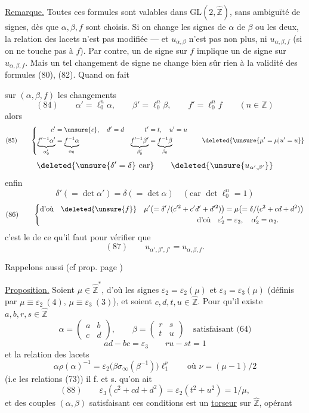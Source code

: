 \uline{Remarque.} Toutes ces formules sont valables dans $\mathrm{GL}(2,\widehat{\mathbb Z})$, sans ambiguïté de signes, dès que $\alpha,\beta,f$ sont choisis. Si on change les signes de $\alpha$  de $\beta$ ou les deux, la relation des lacets n'est pas modifiée --- et $u_{\alpha,\beta}$ n'est pas  non plus,  ni $u_{\alpha,\beta,f}$ (si on ne touche pas à $f$). Par contre, un  de signe sur $f$ implique un  de signe sur $u_{\alpha,\beta,f}$. Mais un tel changement de signe ne change bien sûr rien à la validité des formules (80), (82). Quand on fait


sur $(\alpha,\beta,f)$ les changements 
\[
(84)\qquad
\alpha'=\ell_0^n\alpha,\qquad\beta'=\ell_0^n\beta,\qquad f'=\ell_0^n f
\qquad(n\in\mathbb Z)
\]
alors 
\[
(85)\qquad
\left\{\begin{aligned}
c'&=\unsure{c},\quad d'=d& t'&=t,\quad u'=u\\
\underbrace{f'^{-1}\alpha'}_{\alpha'_0}&=\underbrace{f^{-1}\alpha}_{\alpha_0}&
\underbrace{f'^{-1}\beta'}_{\beta'_0}&=\underbrace{f^{-1}\beta}_{\beta_0}
\end{aligned}\right.
\qquad\deleted{\unsure{\mu'=\mu|u'=u}}
\]
\[
\deleted{\unsure{\delta'=\delta}\text{ car}}
\qquad\deleted{\unsure{u_{\alpha',\beta'}}}
\]
enfin
\[
\delta'(=\det\alpha')=\delta(=\det\alpha)\quad(\text{car }\det \ell_0^n=1)
\]
\[
(86)\qquad
\left\{\begin{aligned}
\text{d'où}\quad\deleted{\unsure{f}}\quad
\mu'\bigl(=\delta'/(c'^2+c'd'+d'^2)\bigr)&=\mu\bigl(=\delta/(c^2+cd+d^2)\bigr)\\
\text{d'où}\quad\varepsilon'_2&=\varepsilon_2,\quad\alpha'_2=\alpha_2.
\end{aligned}\right.
\]
c'est le  de ce qu'il faut pour vérifier  que
\[
(87)\qquad u_{\alpha',\beta',f'}=u_{\alpha,\beta,f}.
\]

Rappelons aussi (cf prop. page )

\uline{Proposition.} Soient $\mu\in\widehat{\mathbb Z}^*$, d'où les signes $\varepsilon_2=\varepsilon_2(\mu)$ et $\varepsilon_3=\varepsilon_3(\mu)$ (définis par $\mu\equiv\varepsilon_2\ (4)$, $\mu\equiv\varepsilon_3\ (3)$), et soient $c,d,t,u\in\widehat{\mathbb Z}$. Pour qu'il existe $a,b,r,s\in\widehat{\mathbb Z}$
\[
\alpha=\begin{pmatrix}a&b\\c&d\end{pmatrix},\qquad
\beta=\begin{pmatrix}r&s\\t&u\end{pmatrix}
\quad\text{satisfaisant (64)}
\]
\[
ad-bc=\varepsilon_3\qquad ru-st=1
\]
et la relation des lacets
\[
\alpha\rho(\alpha)^{-1}=\varepsilon_2\bigl(\beta\sigma_\infty(\beta^{-1})\bigr)\ell_1^\nu
\qquad\text{où }\nu=(\mu-1)/2
\]
(i.e les relations (73)) il f. et s. qu'on ait
\[
(88)\qquad\varepsilon_3(c^2+cd+d^2)=\varepsilon_2(t^2+u^2)=1/\mu,
\]
et  des couples $(\alpha,\beta)$ satisfaisant ces conditions est un \uline{torseur} sur $\widehat{\mathbb Z}$, opérant

